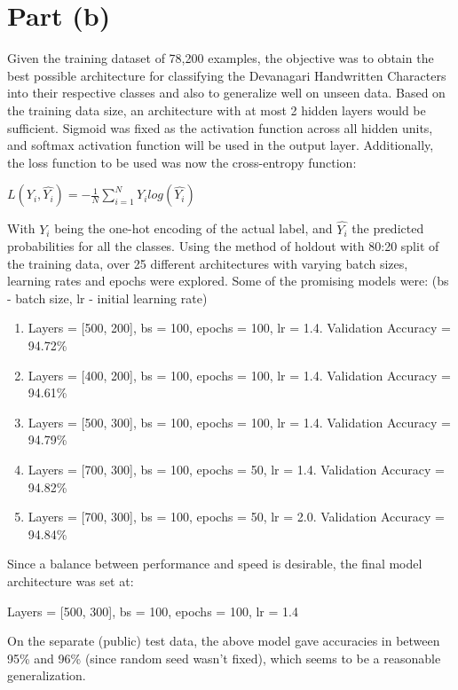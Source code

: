 \documentclass[a4paper]{article}
\begin{document}
\section*{Part (b)}
Given the training dataset of 78,200 examples, the objective was to obtain the best possible architecture for classifying the Devanagari Handwritten Characters into their respective classes and also to generalize well on unseen data.
\newline
\newline
Based on the training data size, an architecture with at most 2 hidden layers would be sufficient. Sigmoid was fixed as the activation function across all hidden units, and softmax activation function will be used in the output layer. 
\newline
\newline
Additionally, the loss function to be used was now the cross-entropy function:
\newline
\newline
\centerline{$L(Y_i, \hat{Y_i}) = -\frac{1}{N}\sum_{i=1}^{N}Y_ilog(\hat{Y_i})$}
\newline
\newline
With $Y_i$ being the one-hot encoding of the actual label, and $\hat{Y_i}$ the predicted probabilities for all the classes.
\newline
\newline
Using the method of holdout with 80:20 split of the training data, over 25 different architectures with varying batch sizes, learning rates and epochs were explored. Some of the promising models were: (bs - batch size, lr - initial learning rate)
\begin{enumerate}
	\item Layers = [500, 200], bs = 100, epochs = 100, lr = 1.4. Validation Accuracy = 94.72\%
    \item Layers = [400, 200], bs = 100, epochs = 100, lr = 1.4. Validation Accuracy = 94.61\%
    \item Layers = [500, 300], bs = 100, epochs = 100, lr = 1.4. Validation Accuracy = 94.79\%
    \item Layers = [700, 300], bs = 100, epochs = 50, lr = 1.4. Validation Accuracy = 94.82\%
    \item Layers = [700, 300], bs = 100, epochs = 50, lr = 2.0. Validation Accuracy = 94.84\%
\end{enumerate}

\noindent Since a balance between performance and speed is desirable, the final model architecture was set at:
\newline
\newline
\centerline{Layers = [500, 300], bs = 100, epochs = 100, lr = 1.4}
\newline
\newline
On the separate (public) test data, the above model gave accuracies in between 95\% and 96\% (since random seed wasn't fixed), which seems to be a reasonable generalization.
\end{document}
